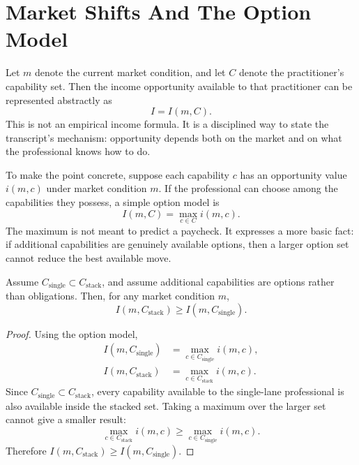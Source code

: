 \section{Market Shifts And The Option Model}

Let \(m\) denote the current market condition, and let \(C\) denote the practitioner's capability set. Then the income opportunity available to that practitioner can be represented abstractly as
\begin{equation}
I=I(m,C).
\end{equation}
This is not an empirical income formula. It is a disciplined way to state the transcript's mechanism: opportunity depends both on the market and on what the professional knows how to do.

To make the point concrete, suppose each capability \(c\) has an opportunity value \(i(m,c)\) under market condition \(m\). If the professional can choose among the capabilities they possess, a simple option model is
\begin{equation}
I(m,C)=\max_{c\in C} i(m,c).
\end{equation}
The maximum is not meant to predict a paycheck. It expresses a more basic fact: if additional capabilities are genuinely available options, then a larger option set cannot reduce the best available move.

\begin{proposition}
Assume \(C_{\text{single}}\subset C_{\text{stack}}\), and assume additional capabilities are options rather than obligations. Then, for any market condition \(m\),
\begin{equation}
I(m,C_{\text{stack}})
\geq
I(m,C_{\text{single}}).
\end{equation}
\end{proposition}

\begin{proof}
Using the option model,
\begin{align}
I(m,C_{\text{single}})
&=
\max_{c\in C_{\text{single}}} i(m,c),\\
I(m,C_{\text{stack}})
&=
\max_{c\in C_{\text{stack}}} i(m,c).
\end{align}
Since \(C_{\text{single}}\subset C_{\text{stack}}\), every capability available to the single-lane professional is also available inside the stacked set. Taking a maximum over the larger set cannot give a smaller result:
\begin{equation}
\max_{c\in C_{\text{stack}}} i(m,c)
\geq
\max_{c\in C_{\text{single}}} i(m,c).
\end{equation}
Therefore \(I(m,C_{\text{stack}})\geq I(m,C_{\text{single}})\).
\end{proof}

